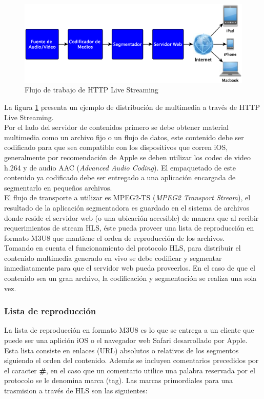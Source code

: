\begin{figure}[H]
	\centering
	\includegraphics[scale=0.5]{imgs/HLS_diagram_wwdc2010.eps}
	\caption{Flujo de trabajo de HTTP Live Streaming}	
	\label{diagramaHLSwwdc2010}
\end{figure}		
		La figura \ref{diagramaHLSwwdc2010} presenta un ejemplo de distribución de multimedia a través de HTTP Live Streaming.\\
		
Por el lado del servidor de contenidos primero se debe obtener material multimedia como un archivo fijo o un flujo de datos, este contenido debe ser codificado para que sea compatible con los dispositivos que corren iOS, generalmente por recomendación de Apple se deben utilizar los codec de video h.264 y de audio AAC (\textit{Advanced Audio Coding}). El empaquetado de este contenido ya codificado debe ser entregado a una aplicación encargada de segmentarlo en pequeños archivos. \\

	El flujo de transporte a utilizar es MPEG2-TS (\textit{MPEG2 Transport Stream}), el resultado de la aplicación segmentadora es guardado en el sistema de archivos donde reside el servidor web (o una ubicación accesible) de manera que al recibir requerimientos de stream HLS, éste pueda proveer una lista de reproducción en formato M3U8 que mantiene el orden de reproducción de los archivos.\\
	
Tomando en cuenta el funcionamiento del protocolo HLS, para distribuir el contenido multimedia generado en vivo se debe codificar y segmentar inmediatamente para que el servidor web pueda proveerlos. En el caso de que el contenido sea un gran archivo, la codificación y segmentación se realiza una sola vez.

\subsubsection{Lista de reproducción}
\label{TAG-SECTION}
La lista de reproducción en formato M3U8 es lo que se entrega a un cliente que puede ser una aplición iOS o el navegador web Safari desarrollado por Apple. Esta lista consiste en enlaces (URL) absolutos o relativos de los segmentos siguiendo el orden del contenido. Además se incluyen comentarios precedidos por el caracter \textbf{\#}, en el caso que un comentario utilice una palabra reservada por el protocolo se le denomina marca (tag).
Las marcas primordiales para una trasmision a través de HLS son las siguientes:

